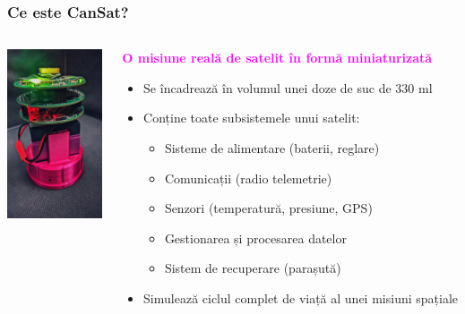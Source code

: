 \begin{frame}
\frametitle{Ce este CanSat?}
\begin{columns}[T]
    \begin{column}{0.3\textwidth}
        \begin{center}  %
            \vspace{-0.5cm}  %
            \includegraphics[height=5cm]{images/CDOSR-CanSat.jpeg}
        \end{center}
    \end{column}
    \begin{column}{0.7\textwidth}
     
        \textcolor{magenta}{\textbf{O misiune reală de satelit în formă miniaturizată}}\\[1em]
        {
        \begin{itemize}
            \item Se încadrează în volumul unei doze de suc de 330 ml
            \item Conține toate subsistemele unui satelit:
            {
                \begin{itemize}
                    \item Sisteme de alimentare (baterii, reglare)
                    \item Comunicații (radio telemetrie)
                    \item Senzori (temperatură, presiune, GPS)
                    \item Gestionarea și procesarea datelor
                    \item Sistem de recuperare (parașută)
                \end{itemize}
                }
            \item Simulează ciclul complet de viață al unei misiuni spațiale
        \end{itemize}
        }
    \end{column}
\end{columns}

\bcolorbar  %
\end{frame}